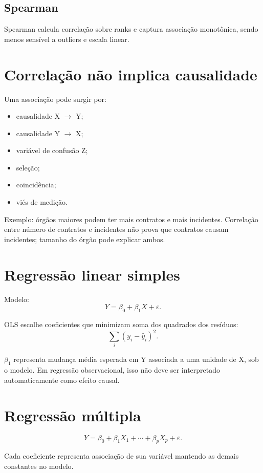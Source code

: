 \subsection{Spearman}

Spearman calcula correlação sobre ranks e captura associação monotônica, sendo menos sensível a outliers e escala linear.

\section{Correlação não implica causalidade}

Uma associação pode surgir por:
\begin{itemize}
\item causalidade X $\rightarrow$ Y;
\item causalidade Y $\rightarrow$ X;
\item variável de confusão Z;
\item seleção;
\item coincidência;
\item viés de medição.
\end{itemize}

Exemplo: órgãos maiores podem ter mais contratos e mais incidentes. Correlação entre número de contratos e incidentes não prova que contratos causam incidentes; tamanho do órgão pode explicar ambos.

\section{Regressão linear simples}

Modelo:
\[
Y=\beta_0+\beta_1X+\varepsilon.
\]

OLS escolhe coeficientes que minimizam soma dos quadrados dos resíduos:
\[
\sum_i(y_i-\hat{y}_i)^2.
\]

$\beta_1$ representa mudança média esperada em Y associada a uma unidade de X, sob o modelo. Em regressão observacional, isso não deve ser interpretado automaticamente como efeito causal.

\section{Regressão múltipla}

\[
Y=\beta_0+\beta_1X_1+\cdots+\beta_pX_p+\varepsilon.
\]

Cada coeficiente representa associação de sua variável mantendo as demais constantes no modelo.

